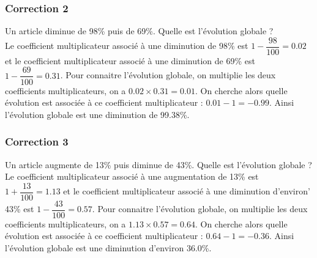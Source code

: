 \documentclass[15pt, mathserif]{beamer}
\begin{document}
\begin{frame}
\vspace{-10mm}
	\frametitle{Correction 2}
\vspace*{1cm} Un article diminue de 98\% puis de 69\%. Quelle est l'évolution globale ? \\ Le coefficient multiplicateur associé à une diminution de 98\% est $1-\dfrac{98}{100} = 0.02$ et le coefficient multiplicateur associé à une diminution de 69\% est $1-\dfrac{69}{100} = 0.31$. Pour connaitre l'évolution globale, on multiplie les deux coefficients multiplicateurs, on a $ 0.02 \times 0.31=0.01$. On cherche alors quelle évolution est associée à ce coefficient multiplicateur : $0.01-1 =-0.99$. Ainsi l'évolution globale est une diminution de 99.38\%. 
 \begin{center} 
 \end{center}\end{frame}


\begin{frame}
\vspace{-10mm}
	\frametitle{Correction 3}
\vspace*{1cm} Un article augmente de 13\% puis diminue de 43\%. Quelle est l'évolution globale ? \\ Le coefficient multiplicateur associé à une augmentation de 13\% est $1+\dfrac{13}{100} = 1.13$ et le coefficient multiplicateur associé à une diminution d'environ' 43\% est $1-\dfrac{43}{100} = 0.57$. Pour connaitre l'évolution globale, on multiplie les deux coefficients multiplicateurs, on a $ 1.13 \times 0.57=0.64$. On cherche alors quelle évolution est associée à ce coefficient multiplicateur : $0.64-1 =-0.36$. Ainsi l'évolution globale est une diminution d'environ 36.0\%. 
 \begin{center} 
 \end{center}\end{frame}
\end{document}
